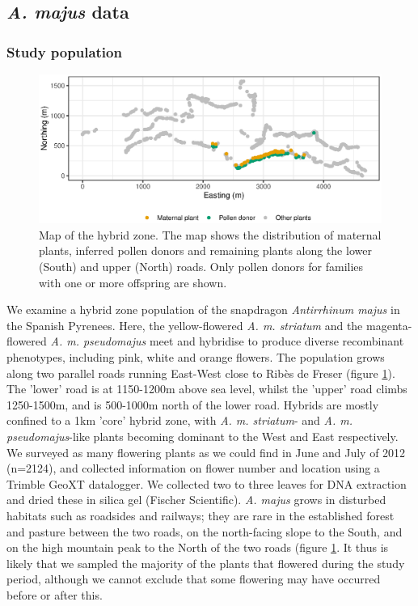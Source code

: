\documentclass[10pt, a4paper, twocolumn]{article} %
\begin{document}
\subsection{\textit{A. majus} data}

\subsubsection{Study population}

\begin{figure}
    \centering
	\includegraphics[]{map.eps} %
	\caption{
        Map of the hybrid zone.
        The map shows the distribution of maternal plants, inferred pollen donors and remaining plants along the lower (South) and upper (North) roads. Only pollen donors for families with one or more offspring are shown.}
	\label{fig:map} %
\end{figure}

We examine a hybrid zone population of the snapdragon \textit{Antirrhinum majus} in the Spanish Pyrenees. Here, the yellow-flowered \textit{A. m. striatum} and the magenta-flowered \textit{A. m. pseudomajus} meet and hybridise to produce diverse recombinant phenotypes, including pink, white and orange flowers.
The population grows along two parallel roads running East-West close to Rib\`{e}s de Freser (figure \ref{fig:map}). The ’lower’ road is at 1150-1200m above sea level, whilst the ’upper’ road climbs 1250-1500m, and is 500-1000m north of the lower road. Hybrids are mostly confined to a 1km ’core’ hybrid zone, with \textit{A. m. striatum}- and \textit{A. m. pseudomajus}-like plants becoming dominant to the West and East respectively. We surveyed as many flowering plants as we could find in June and July of 2012 (n=2124), and collected information on flower number and location using a Trimble GeoXT datalogger. We collected two to three leaves for DNA extraction and dried these in silica gel (Fischer Scientific). \textit{A. majus} grows in disturbed habitats such as roadsides and railways; they are rare in the established forest and pasture between the two roads, on the north-facing slope to the South, and on the high mountain peak to the North of the two roads (figure \ref{fig:map}. It thus is likely that we sampled the majority of the plants that flowered during the study period, although we cannot exclude that some flowering may have occurred before or after this. 
\end{document}
